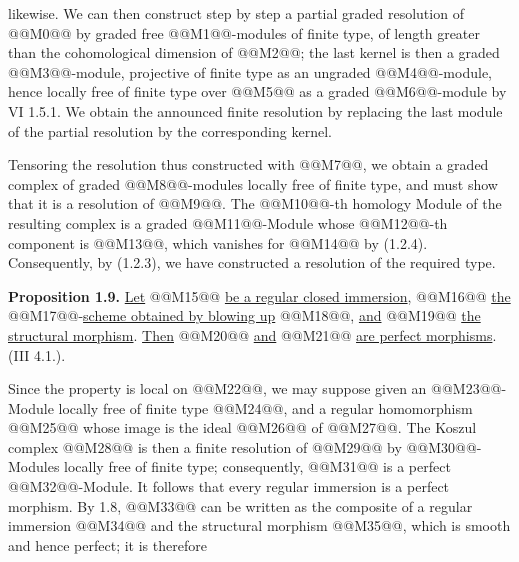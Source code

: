 likewise. We can then construct step by step a partial graded resolution of @@M0@@ by graded free @@M1@@-modules of finite type, of length greater than the cohomological dimension of @@M2@@; the last kernel is then a graded @@M3@@-module, projective of finite type as an ungraded @@M4@@-module, hence locally free of finite type over @@M5@@ as a graded @@M6@@-module by VI 1.5.1. We obtain the announced finite resolution by replacing the last module of the partial resolution by the corresponding kernel.

Tensoring the resolution thus constructed with @@M7@@, we obtain a graded complex of graded @@M8@@-modules locally free of finite type, and must show that it is a resolution of @@M9@@. The @@M10@@-th homology Module of the resulting complex is a graded @@M11@@-Module whose @@M12@@-th component is @@M13@@, which vanishes for @@M14@@ by (1.2.4). Consequently, by (1.2.3), we have constructed a resolution of the required type.

\textbf{Proposition 1.9.} \uline{Let} @@M15@@ \uline{be a regular closed immersion}, @@M16@@ \uline{the} @@M17@@-\uline{scheme obtained by blowing up} @@M18@@, \uline{and} @@M19@@ \uline{the structural morphism}. \uline{Then} @@M20@@ \uline{and} @@M21@@ \uline{are perfect morphisms}. (III 4.1.).

Since the property is local on @@M22@@, we may suppose given an @@M23@@-Module locally free of finite type @@M24@@, and a regular homomorphism @@M25@@ whose image is the ideal @@M26@@ of @@M27@@. The Koszul complex @@M28@@ is then a finite resolution of @@M29@@ by @@M30@@-Modules locally free of finite type; consequently, @@M31@@ is a perfect @@M32@@-Module. It follows that every regular immersion is a perfect morphism. By 1.8, @@M33@@ can be written as the composite of a regular immersion @@M34@@ and the structural morphism @@M35@@, which is smooth and hence perfect; it is therefore
